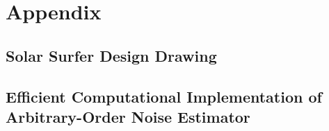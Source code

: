 \documentclass[conf]{new-aiaa}
\begin{document}
    \section*{Appendix}

    \newpage

    \subsection{Solar Surfer Design Drawing}
    \label{subsec:solar_surfer_drawing}

    \begin{figure}[H]
        \centering
        \label{fig:solar_surfer_design}
    \end{figure}

    \newpage

    \subsection{Efficient Computational Implementation of Arbitrary-Order Noise Estimator}
\end{document}
